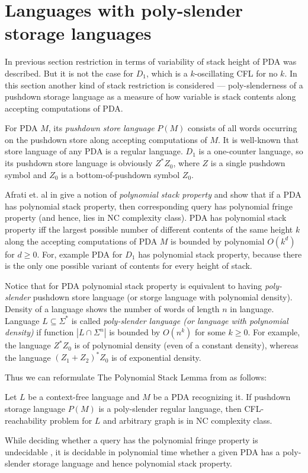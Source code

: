 \section{Languages with poly-slender storage languages}
\label{sec:poly}
In previous section restriction in terms of variability of stack height of PDA was described. But it is not the case for $D_1$, which is a $k$-oscillating CFL for no $k$. In this section another kind of stack restriction is considered --- poly-slenderness of a pushdown storage language as a measure of how variable is stack contents along accepting computations of PDA.


For PDA $M$, its \textit{pushdown store language} $P(M)$ consists of all words
occurring on the pushdown store along accepting computations of $M$. It is well-known that store language of any PDA is a regular language. $D_1$ is a one-counter language, so its pushdown store language is obviously $Z^*Z_0$, where $Z$ is a single pushdown symbol and $Z_0$ is a bottom-of-pushdown symbol $Z_0$.


Afrati et. al in \cite{ChainQ} give a notion of \textit{polynomial stack property} and show that if a PDA has polynomial stack property, then corresponding query has polynomial fringe property (and hence, lies in NC complexity class). PDA has polynomial stack property iff the largest possible number of different contents of the same height $k$ along the accepting computations of PDA $M$ is bounded by polynomial $O(k^d)$ for $d \ge 0$.  For, example PDA for $D_1$ has polynomial stack property, because there is the only one possible variant of contents for every height of stack.


Notice that for PDA polynomial stack property is equivalent to having \textit{poly-slender} pushdown store language (or storge language with polynomial density). Density of a language shows the number of words of length $n$ in language. Language $L \subseteq \Sigma^*$ is called \textit{poly-slender language (or language with polynomial density)} if function $|L \cap \Sigma^n|$ is bounded by $O(n^k)$ for some $k \ge 0$. For example, the language $Z^*Z_0$ is of polynomial density (even of a constant density), whereas the language ${(Z_1 + Z_2)}^*Z_0$ is of exponential density.


Thus we can reformulate The Polynomial Stack Lemma from \cite{ChainQ} as follows:
\begin{lemma}
Let $L$ be a context-free language and $M$ be a PDA recognizing it. If pushdown storage language $P(M)$ is a poly-slender regular language, then CFL-reachability problem for $L$ and arbitrary graph is in NC complexity class.
\end{lemma}
While deciding whether a query has the polynomial fringe property is undecidable \cite{Ullman}, it is decidable in polynomial time whether a given PDA has a poly-slender storage language and hence polynomial stack property. 


